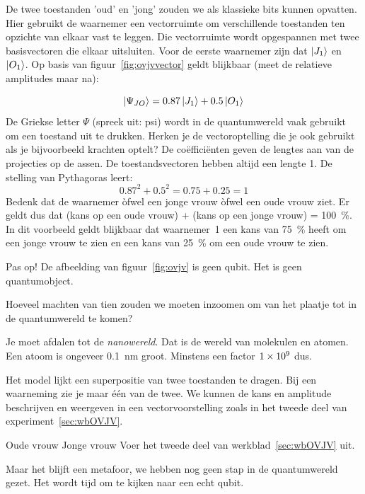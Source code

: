 \documentclass[../../main.tex]{subfiles}
\begin{document}
De twee toestanden 'oud' en 'jong' zouden we als klassieke bits kunnen opvatten. Hier gebruikt de waarnemer een vectorruimte om verschillende toestanden ten opzichte van elkaar vast te leggen. Die vectorruimte wordt opgespannen met twee basisvectoren die elkaar uitsluiten. Voor de eerste waarnemer zijn dat $\ket{J_1}$ en $\ket{O_1}$. Op basis van figuur~\ref{fig:ovjvvector} geldt blijkbaar (meet de relatieve amplitudes maar na):


\[\ket{\Psi_{JO}} = \num{0,87}\ket{J_1} +  \num{0,5}\ket{O_1}\]
De Griekse letter $\Psi$ (spreek uit: psi) wordt in de quantumwereld vaak gebruikt om een toestand uit te drukken. Herken je de vectoroptelling die je ook gebruikt als je bijvoorbeeld krachten optelt? De co\"effici\"enten geven de lengtes aan van de projecties op de assen. De toestandsvectoren hebben altijd een lengte 1. De stelling van Pythagoras leert: 
\[\num{0,87}^2 + \num{0,5}^2 = \num{0,75} + \num{0,25}  = \num{1}\]  
Bedenk dat de waarnemer \`ofwel een jonge vrouw \`ofwel een oude vrouw ziet. Er geldt dus dat (kans op een oude vrouw) + (kans op een jonge vrouw) = \SI{100}{\percent}. 
In dit voorbeeld geldt blijkbaar dat waarnemer~1 een kans van \SI{75}{\percent} heeft om een jonge vrouw te zien en een kans van \SI{25}{\percent} om een oude vrouw te zien. 

Pas op! De afbeelding van figuur~\ref{fig:ovjv} is geen qubit. Het is geen quantumobject. 
\medskip
\begin{opdracht}\label{opd:inzoomen}%
Hoeveel machten van tien zouden we moeten inzoomen om van het plaatje tot in de quantumwereld te komen?
\end{opdracht}
\begin{antwoord}[-3cm]
Je moet afdalen tot de \textit{nanowereld}. Dat is de wereld van molekulen en atomen. Een atoom is ongeveer \SI{0.1}{\nano\meter} groot. Minstens een factor $\num{1E9}$ dus.
\end{antwoord}

Het model lijkt een superpositie van twee toestanden te dragen. Bij een waarneming zie je maar \'e\'en van de twee. We kunnen de kans en amplitude beschrijven en weergeven in een vectorvoorstelling zoals in het tweede deel van experiment~\ref{sec:wbOVJV}.
\medskip
\begin{experiment}{Oude vrouw Jonge vrouw}
Voer het tweede deel van werkblad~\ref{sec:wbOVJV} uit.
\end{experiment}
Maar het blijft een metafoor, we hebben nog geen stap in de quantumwereld gezet. Het wordt tijd om te kijken naar een echt qubit.
\end{document}
